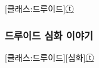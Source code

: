 \documentclass{report}
\begin{document}
	\begin{story}{}{[클래스:드루이드]\hyperlink{celesteela}{ⓣ}}
		
	\end{story}
	
	\subsubsection{드루이드 심화 이야기}
		\begin{story}{}{[클래스:드루이드][심화]\hyperlink{celesteela}{ⓣ}}
			
		\end{story}
\end{document}
